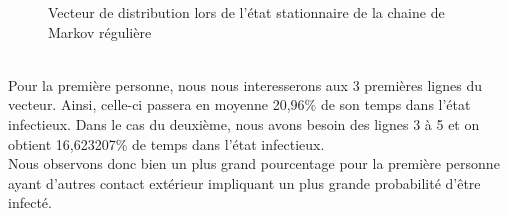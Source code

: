 \documentclass[a4paper, 11pt, oneside]{article}
\begin{document}
\begin{itemize}
\begin{figure}[h]
        \caption{Vecteur de distribution lors de l'état stationnaire de la chaine de Markov régulière}
    \end{figure}
    \\Pour la première personne, nous nous interesserons aux 3 premières lignes du 
    vecteur. Ainsi, celle-ci passera en moyenne 20,96\% de son temps dans l'état infectieux.
    Dans le cas du deuxième, nous avons besoin des lignes 3 à 5 et on obtient 16,623207\% de temps 
    dans l'état infectieux. 
    \\Nous observons donc bien un plus grand pourcentage 
    pour la première personne ayant d'autres contact extérieur impliquant un 
    plus grande probabilité d'être infecté.

\end{itemize}
\end{document}
